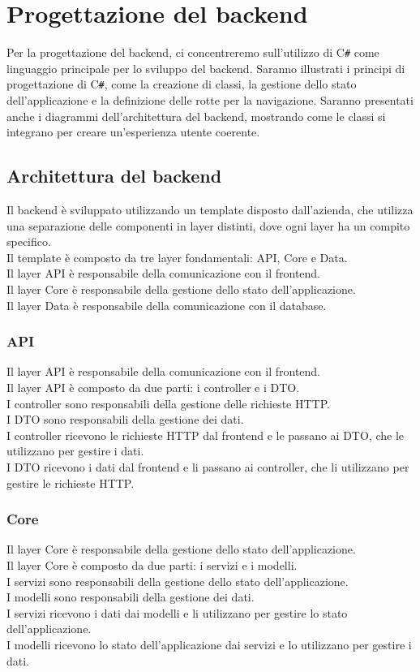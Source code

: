 \section{Progettazione del backend}
Per la progettazione del backend, ci concentreremo sull'utilizzo di C\texttt{\#} come linguaggio principale per lo sviluppo del backend. Saranno illustrati i principi di progettazione di C\texttt{\#}, come la creazione di classi, la gestione dello stato dell'applicazione e la definizione delle rotte per la navigazione. Saranno presentati anche i diagrammi dell'architettura del backend, mostrando come le classi si integrano per creare un'esperienza utente coerente.

\subsection{Architettura del backend}
Il backend è sviluppato utilizzando un template disposto dall'azienda, che utilizza una separazione delle componenti in layer distinti, dove ogni layer ha un compito specifico.\\
Il template è composto da tre layer fondamentali: API, Core e Data.\\
Il layer API è responsabile della comunicazione con il frontend.\\
Il layer Core è responsabile della gestione dello stato dell'applicazione.\\
Il layer Data è responsabile della comunicazione con il database.\\

\subsubsection{API}
Il layer API è responsabile della comunicazione con il frontend.\\
Il layer API è composto da due parti: i controller e i DTO.\\
I controller sono responsabili della gestione delle richieste HTTP.\\
I DTO sono responsabili della gestione dei dati.\\
I controller ricevono le richieste HTTP dal frontend e le passano ai DTO, che le utilizzano per gestire i dati.\\
I DTO ricevono i dati dal frontend e li passano ai controller, che li utilizzano per gestire le richieste HTTP.\\
\subsubsection{Core}
Il layer Core è responsabile della gestione dello stato dell'applicazione.\\
Il layer Core è composto da due parti: i servizi e i modelli.\\
I servizi sono responsabili della gestione dello stato dell'applicazione.\\
I modelli sono responsabili della gestione dei dati.\\
I servizi ricevono i dati dai modelli e li utilizzano per gestire lo stato dell'applicazione.\\
I modelli ricevono lo stato dell'applicazione dai servizi e lo utilizzano per gestire i dati.\\
